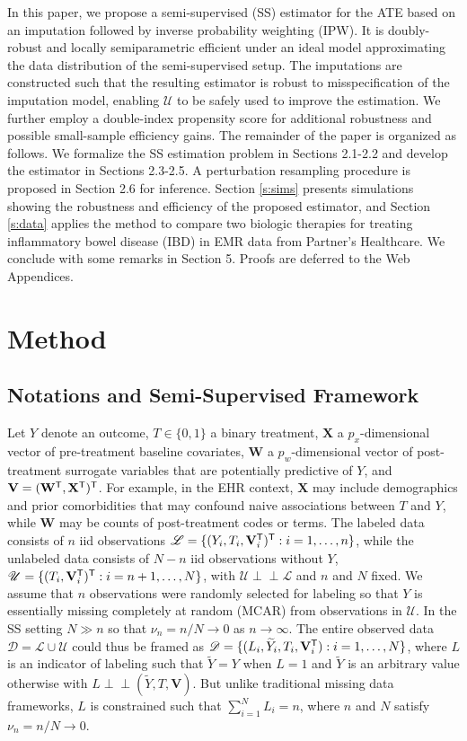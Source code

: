 \documentclass[useAMS,referee,usenatbib]{biom}
\def\bX{\mathbf{X}}
\def\bW{\mathbf{W}}
\def\bV{\mathbf{V}}
\def\Ytld{\widetilde{Y}}
\def\Lscr{\mathscr{L}}
\def\Uscr{\mathscr{U}}
\def\Dscr{\mathscr{D}}
\def\ntot{N}
\def\trans{^{\sf \tiny T}}
\def\indep{\perp\!\!\!\perp}
\begin{document}
In this paper, we propose a semi-supervised (SS) estimator for the ATE 
based on an imputation followed by inverse probability weighting (IPW).  It is doubly-robust and locally semiparametric efficient under an ideal model approximating the data distribution of the semi-supervised setup.
The imputations are constructed such that the resulting estimator is robust to misspecification of the imputation model, enabling $\Uscr$ to be safely used to improve the estimation.  We further employ a double-index propensity score \citep{cheng2017estimating} for additional robustness and possible small-sample efficiency gains.  The remainder of the paper is organized as follows.  We formalize the SS estimation problem in Sections 2.1-2.2 and develop the estimator in Sections 2.3-2.5.  A perturbation resampling procedure is proposed in Section 2.6 for inference. Section \ref{s:sims} presents simulations showing the robustness and efficiency of the proposed estimator, and Section \ref{s:data} applies the method to compare two biologic therapies for treating inflammatory bowel disease (IBD) in EMR data from Partner's Healthcare.  We conclude with some remarks in Section 5.  Proofs are deferred to the Web Appendices.

\section{Method}
\label{s:method}

\subsection{Notations and Semi-Supervised Framework}
Let $Y$ denote an outcome,
$T\in \{ 0,1\}$ a binary treatment, $\bX$ a $p_x$-dimensional vector of pre-treatment baseline covariates, $\bW$ a $p_w$-dimensional vector of post-treatment surrogate variables that are potentially predictive of $Y$, and $\bV = (\bW\trans,\bX\trans)\trans$.  
For example, in the EHR context, $\bX$ may include demographics and prior comorbidities that may confound 
naive associations between $T$ and $Y$, while $\bW$ may be counts of post-treatment codes or terms.
The labeled data consists of $n$ iid observations $\Lscr = \{ (Y_i,T_i,\bV_i\trans)\trans:i=1,\ldots,n\}$, while the unlabeled data consists of $N-n$ iid observations without $Y$, $\Uscr = \{ (T_i,\bV_i\trans)\trans : i=n+1,\ldots,\ntot\}$, with $\Uscr \indep \Lscr$ and $n$ and $N$ fixed.   
We assume that $n$ observations were randomly selected for labeling so that $Y$ is essentially missing completely at random (MCAR) from observations in $\Uscr$.  In the SS setting $N \gg n$ so that $\nu_n = n/N \to 0$ as $n\to \infty$.
The entire observed data $\Dscr = \Lscr \cup \Uscr$ could thus be framed as $\Dscr = \{ (L_i,\Ytld_i,T_i,\bV_i\trans): i=1,\ldots,N\}$, where $L$ is an indicator of labeling such that $\Ytld = Y$ when $L=1$ and $\Ytld$ is an arbitrary value otherwise with $L \indep (\Ytld, T, \bV)$. But unlike traditional missing data frameworks, $L$ is constrained such that $\sum_{i=1}^N L_i = n$,
where $n$ and $N$ satisfy $\nu_n = n/N \to 0$.
\end{document}
